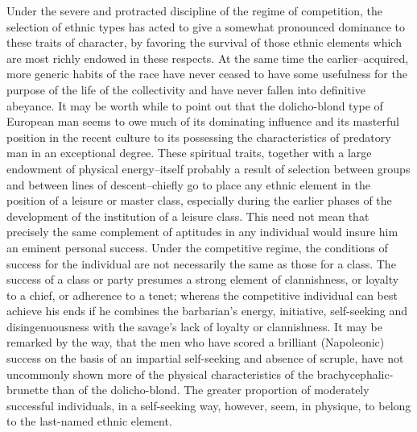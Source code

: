 \documentclass[12pt]{report}
\begin{document}
Under the severe and protracted discipline of the regime of competition,
the selection of ethnic types has acted to give a somewhat pronounced
dominance to these traits of character, by favoring the survival of
those ethnic elements which are most richly endowed in these respects.
At the same time the earlier--acquired, more generic habits of the race
have never ceased to have some usefulness for the purpose of the life of
the collectivity and have never fallen into definitive abeyance. It may
be worth while to point out that the dolicho-blond type of European man
seems to owe much of its dominating influence and its masterful position
in the recent culture to its possessing the characteristics of predatory
man in an exceptional degree. These spiritual traits, together with
a large endowment of physical energy--itself probably a result of
selection between groups and between lines of descent--chiefly go to
place any ethnic element in the position of a leisure or master
class, especially during the earlier phases of the development of the
institution of a leisure class. This need not mean that precisely the
same complement of aptitudes in any individual would insure him an
eminent personal success. Under the competitive regime, the conditions
of success for the individual are not necessarily the same as those for
a class. The success of a class or party presumes a strong element of
clannishness, or loyalty to a chief, or adherence to a tenet; whereas
the competitive individual can best achieve his ends if he combines the
barbarian's energy, initiative, self-seeking and disingenuousness with
the savage's lack of loyalty or clannishness. It may be remarked by the
way, that the men who have scored a brilliant (Napoleonic) success on
the basis of an impartial self-seeking and absence of scruple, have
not uncommonly shown more of the physical characteristics of the
brachycephalic-brunette than of the dolicho-blond. The greater
proportion of moderately successful individuals, in a self-seeking way,
however, seem, in physique, to belong to the last-named ethnic element.
\end{document}
